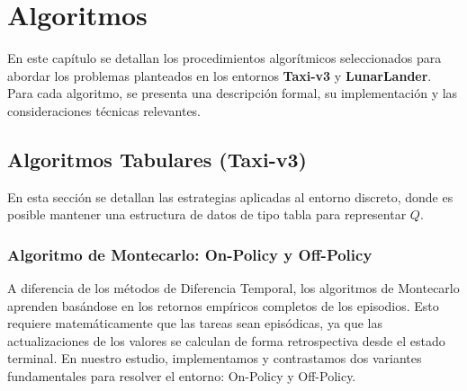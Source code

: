 
\section{Algoritmos}

En este capítulo se detallan los procedimientos algorítmicos seleccionados para abordar los 
problemas planteados en los entornos \textbf{Taxi-v3} y \textbf{LunarLander}. 
Para cada algoritmo, se presenta una descripción formal, su implementación y 
las consideraciones técnicas relevantes.

\subsection{Algoritmos Tabulares (Taxi-v3)}

En esta sección se detallan las estrategias aplicadas al entorno discreto, donde es 
posible mantener una estructura de datos de tipo tabla para representar $Q$.

\subsubsection{Algoritmo de Montecarlo: On-Policy y Off-Policy}

A diferencia de los métodos de Diferencia Temporal, los algoritmos de Montecarlo aprenden 
basándose en los retornos empíricos completos de los episodios. Esto requiere matemáticamente 
que las tareas sean episódicas, ya que las actualizaciones de los valores se calculan de forma 
retrospectiva desde el estado terminal. En nuestro estudio, implementamos y contrastamos dos 
variantes fundamentales para resolver el entorno: On-Policy y Off-Policy.

